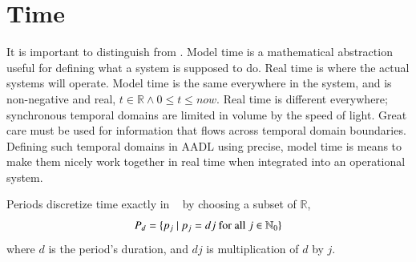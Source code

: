 %

\section{Time}\label{sec:informal_timemodel}

\pn It is important to distinguish  from .  
Model time is a mathematical abstraction useful for defining what a system is supposed to do.
Real time is where the actual systems will operate.
Model time is the same everywhere in the system, and is non-negative and real, $t\in\mathbb{R}\wedge 0 \le t \le now$.
Real time is different everywhere; synchronous temporal domains are limited in volume by the speed of light.
Great care must be used for information that flows across temporal domain boundaries.
Defining such temporal domains in AADL using precise, model time is means to make them nicely work together in real time when integrated into an operational system.

\pn Periods discretize time exactly in \lang~ by choosing a subset of $\mathbb{R}$,
\[P_{d}=\{p_{j}~\vert~ p_{j}=dj~$for all$~j\in\mathbb{N}_{0}\}\]
where $d$ is the period's duration, and $dj$ is multiplication of $d$ by $j$.

